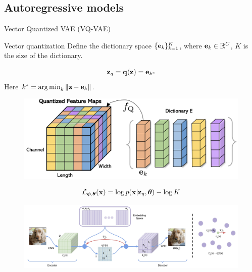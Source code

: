 \subsection{Autoregressive models}
\begin{frame}{Vector Quantized VAE (VQ-VAE) }
	\begin{block}{Vector quantization}
		Define the dictionary space $\{\mathbf{e}_k\}_{k=1}^K$, where $\mathbf{e}_k \in \mathbb{R}^C$, $K$ is the size of the dictionary.
		\vspace{-0.5cm}
		\begin{minipage}[t]{0.45\columnwidth}
			\[
				\mathbf{z}_q = \mathbf{q} (\mathbf{z}) = \mathbf{e}_{k^*}
			\] 
			Here $k^* = \operatorname*{arg\,min}_k \| \mathbf{z} - \mathbf{e}_k \|$.
		\end{minipage}%
		\begin{minipage}[t]{0.55\columnwidth}
			\vspace{-0.5cm}
			\begin{figure}
				\includegraphics[width=\linewidth]{figs/fqgan_cnn}
			\end{figure}
		\end{minipage}		
	\end{block}
	\[
		\mathcal{L}_{\boldsymbol{\phi}, \boldsymbol{\theta}}(\mathbf{x})  =  \log p(\mathbf{x} | \mathbf{z}_q, \boldsymbol{\theta}) - \log K
	\]
	\vspace{-0.5cm}
	\begin{figure}
		\centering
		\includegraphics[width=\linewidth]{figs/vqvae}
	\end{figure}
\end{frame}
